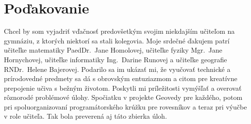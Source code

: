 \thispagestyle{empty}
\vspace*{\fill}
\section*{Poďakovanie}
Chcel by som vyjadriť vďačnosť predovšetkým svojim niekdajším učiteľom na gymnáziu, z ktorých niektorí sa stali kolegovia. Moje srdečné ďakujem patrí učiteľke matematiky PaedDr.~Jane Homolovej, učiteľke fyziky Mgr.~Jane Hornychovej, učiteľke informatiky Ing.~Darine Runovej a učiteľke geografie RNDr.~Helene Bajerovej. Podarilo sa im ukázať mi, že vyučovať technické a prírodovedné predmety sa dá s obrovským entuziazmom a citom pre kreatívne prepojenie učiva s bežným životom. Poskytli mi príležitosti vymýšľať a overovať rôznorodé problémové úlohy. Spočiatku v projekte Geovedy pre každého, potom pri spoluorganizovaní programátorského krúžku pre rovesníkov a teraz pri výučbe v role učiteľa. Tak bola preverená aj táto zbierka úloh.
\vspace{3cm}